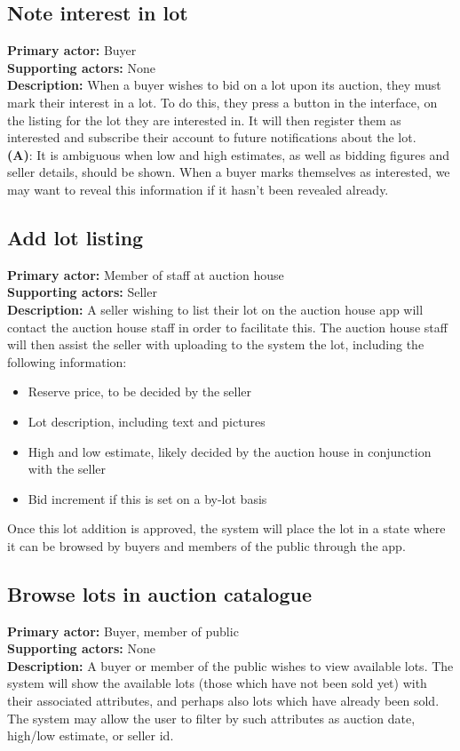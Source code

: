 \documentclass[titlepage, 12pt]{extarticle}
\begin{document}
\subsection{Note interest in lot}
{\bf Primary actor: } Buyer
\\{\bf Supporting actors: } None
\\{\bf Description: } When a buyer wishes to bid on a lot upon its auction, they must mark their interest in a lot. To do this, they press a button in the interface, on the listing for the lot they are interested in. It will then register them as interested and subscribe their account to future notifications about the lot.
\\{\bf (A)}: It is ambiguous when low and high estimates, as well as bidding figures and seller details, should be shown. When a buyer marks themselves as interested, we may want to reveal this information if it hasn't been revealed already.
\subsection{Add lot listing}
{\bf Primary actor: } Member of staff at auction house
\\{\bf Supporting actors: } Seller
\\{\bf Description: } A seller wishing to list their lot on the auction house app will contact the auction house staff in order to facilitate this. The auction house staff will then assist the seller with uploading to the system the lot, including the following information:
\begin{itemize}
\item Reserve price, to be decided by the seller
\item Lot description, including text and pictures
\item High and low estimate, likely decided by the auction house in conjunction with the seller
\item Bid increment if this is set on a by-lot basis
\end{itemize}

Once this lot addition is approved, the system will place the lot in a state where it can be browsed by buyers and members of the public through the app.

\subsection{Browse lots in auction catalogue}
{\bf Primary actor: } Buyer, member of public
\\{\bf Supporting actors: } None
\\{\bf Description: } A buyer or member of the public wishes to view available lots. The system will show the available lots (those which have not been sold yet) with their associated attributes, and perhaps also lots which have already been sold. The system may allow the user to filter by such attributes as auction date, high/low estimate, or seller id. 
\end{document}
